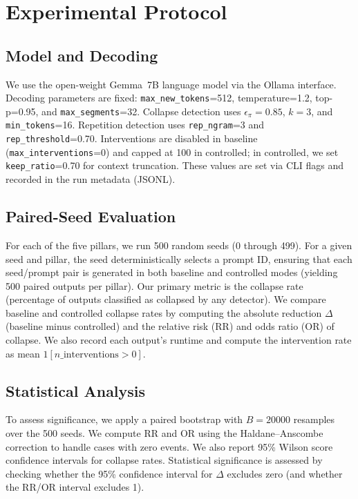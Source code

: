 \documentclass{article}
\begin{document}
\section{Experimental Protocol}
\subsection{Model and Decoding}
We use the open-weight Gemma~7B language model via the Ollama interface. Decoding parameters are fixed: \texttt{max\_new\_tokens}=512, temperature=1.2, top-p=0.95, and \texttt{max\_segments}=32. Collapse detection uses $\epsilon_{\pi}=0.85$, $k=3$, and \texttt{min\_tokens}=16. Repetition detection uses \texttt{rep\_ngram}=3 and \texttt{rep\_threshold}=0.70. Interventions are disabled in baseline (\texttt{max\_interventions}=0) and capped at 100 in controlled; in controlled, we set \texttt{keep\_ratio}=0.70 for context truncation. These values are set via CLI flags and recorded in the run metadata (JSONL).

\subsection{Paired-Seed Evaluation}
For each of the five pillars, we run 500 random seeds (0 through 499). For a given seed and pillar, the seed deterministically selects a prompt ID, ensuring that each seed/prompt pair is generated in both baseline and controlled modes (yielding 500 paired outputs per pillar). Our primary metric is the collapse rate (percentage of outputs classified as collapsed by any detector). We compare baseline and controlled collapse rates by computing the absolute reduction $\Delta$ (baseline minus controlled) and the relative risk (RR) and odds ratio (OR) of collapse. We also record each output's runtime and compute the intervention rate as mean $1[n\_{\text{interventions}}>0]$.

\subsection{Statistical Analysis}
To assess significance, we apply a paired bootstrap with $B=20000$ resamples over the 500 seeds. We compute RR and OR using the Haldane--Anscombe correction to handle cases with zero events. We also report 95\% Wilson score confidence intervals for collapse rates. Statistical significance is assessed by checking whether the 95\% confidence interval for $\Delta$ excludes zero (and whether the RR/OR interval excludes 1).
\end{document}
